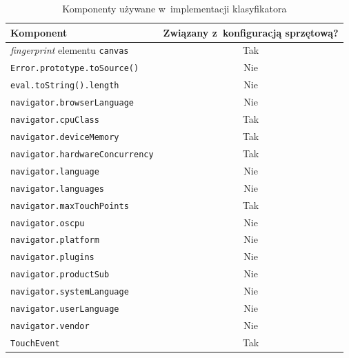 \begin{table}
	\centering
	\caption{Komponenty używane w~implementacji klasyfikatora}
	\begin{tabular}{|l|c|}
		\hline
		Komponent                                   & Związany z~konfiguracją sprzętową? \\
		\hline
		\emph{fingerprint} elementu \texttt{canvas} & Tak                                    \\
		\texttt{Error.prototype.toSource()}         & Nie                                    \\
		\texttt{eval.toString().length}             & Nie                                    \\
		\texttt{navigator.browserLanguage}          & Nie                                    \\
		\texttt{navigator.cpuClass}                 & Tak                                    \\
		\texttt{navigator.deviceMemory}             & Tak                                    \\
		\texttt{navigator.hardwareConcurrency}      & Tak                                    \\
		\texttt{navigator.language}                 & Nie                                    \\
		\texttt{navigator.languages}                & Nie                                    \\
		\texttt{navigator.maxTouchPoints}           & Tak                                    \\
		\texttt{navigator.oscpu}                    & Nie                                    \\
		\texttt{navigator.platform}                 & Nie                                    \\
		\texttt{navigator.plugins}                  & Nie                                    \\
		\texttt{navigator.productSub}               & Nie                                    \\
		\texttt{navigator.systemLanguage}           & Nie                                    \\
		\texttt{navigator.userLanguage}             & Nie                                    \\
		\texttt{navigator.vendor}                   & Nie                                    \\
		\texttt{TouchEvent}                         & Tak                                    \\

\end{tabular}
\end{table}
